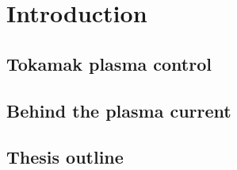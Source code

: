 \chapter{Introduction}


\section{Tokamak plasma control}

\section{Behind the plasma current}

\section{Thesis outline}
